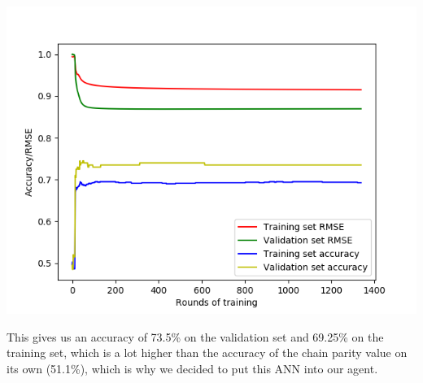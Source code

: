 \begin{center}
\includegraphics[scale=0.65]{images/ann_rmse+accuracy_(MCTS2_1000_games).png}
\end{center}

This gives us an accuracy of 73.5\% on the validation set and 69.25\% on the training set, which is a lot higher than the accuracy of the chain parity value on its own (51.1\%), which is why we decided to put this ANN into our agent.
